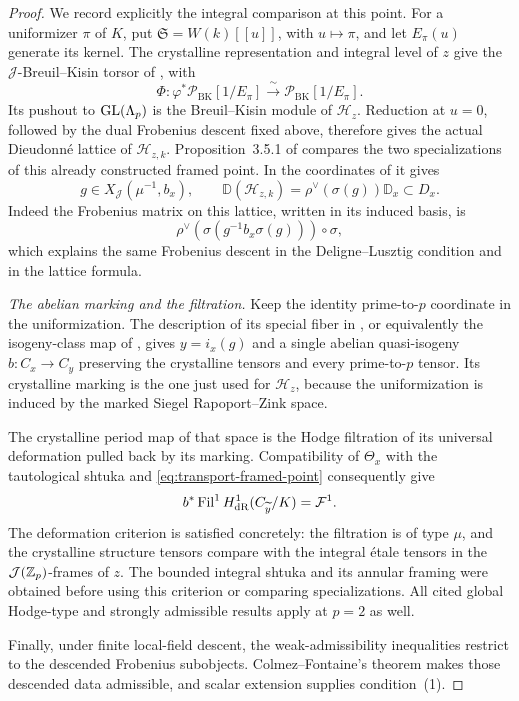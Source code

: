\begin{proof}
We record explicitly the integral comparison at this point.
For a uniformizer $\pi$ of $K$, put
$\mathfrak S=W(k)[[u]]$, with $u\mapsto\pi$, and let
$E_\pi(u)$ generate its kernel.  The crystalline representation
and integral level of $z$ give the $\mathcal J$-Breuil--Kisin
torsor of \cite[\S3.5]{PappasRapoport2024}, with
\[
 \Phi:\varphi^*\mathcal P_{\mathrm{BK}}[1/E_\pi]
             \xrightarrow{\ \sim\ }
             \mathcal P_{\mathrm{BK}}[1/E_\pi].
\]
Its pushout to $\operatorname{GL}(\Lambda_p)$ is the Breuil--Kisin module of
$\mathcal H_z$.  Reduction at $u=0$, followed by the dual
Frobenius descent fixed above, therefore gives the actual
Dieudonn\'e lattice of $\mathcal H_{z,k}$.
Proposition~3.5.1 of \cite{PappasRapoport2024} compares the two
specializations of this already constructed framed point.  In
the coordinates of \cite[Theorem~2.2.5]{KisinZhou2025} it gives
\[
 g\in X_{\mathcal J}(\mu^{-1},b_x),\qquad
 \mathbb D(\mathcal H_{z,k})
       =\rho^\vee(\sigma(g))\mathbb D_x\subset D_x.
\]
Indeed the Frobenius matrix on this lattice, written in its
induced basis, is
\[
 \rho^\vee\!\left(
       \sigma(g^{-1}b_x\sigma(g))\right)\circ\sigma,
\]
which explains the same Frobenius descent in the
Deligne--Lusztig condition and in the lattice formula.

\medskip\noindent
\emph{The abelian marking and the filtration.}
Keep the identity prime-to-$p$ coordinate in the uniformization.
The description of its special fiber in
\cite[\S4.10.3]{PappasRapoport2024}, or equivalently the
isogeny-class map of \cite[Theorem~2.2.5]{KisinZhou2025}, gives
$y=i_x(g)$ and a single abelian quasi-isogeny
$b:C_x\to C_y$ preserving the crystalline tensors and every
prime-to-$p$ tensor.  Its crystalline marking is the one just
used for $\mathcal H_z$, because the uniformization is induced
by the marked Siegel Rapoport--Zink space.

The crystalline period map of that space is the Hodge filtration
of its universal deformation pulled back by its marking.
Compatibility of $\Theta_x$ with the tautological shtuka and
\eqref{eq:transport-framed-point} consequently give
\[
 b^*\operatorname{Fil}^1H^1_{\mathrm{dR}}(C_{\widetilde y}/K)
       =\mathcal F^1.
\]
The deformation criterion
\cite[Proposition~2.2.3]{KisinZhou2025} is satisfied concretely:
the filtration is of type $\mu$, and the crystalline structure
tensors compare with the integral \'{e}tale tensors in the
$\mathcal J(\mathbb Z_p)$-frames of $z$.  The bounded integral shtuka
and its annular framing were obtained before using this
criterion or comparing specializations.  All cited global
Hodge-type and strongly admissible results apply at $p=2$ as
well.

Finally, under finite local-field descent, the weak-admissibility
inequalities restrict to the descended Frobenius subobjects.
Colmez--Fontaine's theorem
\cite[Theorem~A]{ColmezFontaine2000} makes those descended data
admissible, and scalar extension supplies condition~\textup{(1)}.
\end{proof}


